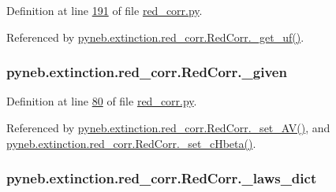 \begin{DoxyVerb}
Definition at line \hyperlink{red__corr_8py_source_l00191}{191} of file \hyperlink{red__corr_8py_source}{red\-\_\-corr.\-py}.



Referenced by \hyperlink{red__corr_8py_source_l00156}{pyneb.\-extinction.\-red\-\_\-corr.\-Red\-Corr.\-\_\-get\-\_\-uf()}.

\hypertarget{classpyneb_1_1extinction_1_1red__corr_1_1_red_corr_a99ab4dcd33d50360f4fb61bc80fc90d5}{
\subsubsection[{\-\_\-given}]{\setlength{\rightskip}{0pt plus 5cm}pyneb.\-extinction.\-red\-\_\-corr.\-Red\-Corr.\-\_\-given\hspace{0.3cm}{\ttfamily [private]}}}\label{classpyneb_1_1extinction_1_1red__corr_1_1_red_corr_a99ab4dcd33d50360f4fb61bc80fc90d5}


Definition at line \hyperlink{red__corr_8py_source_l00080}{80} of file \hyperlink{red__corr_8py_source}{red\-\_\-corr.\-py}.



Referenced by \hyperlink{red__corr_8py_source_l00169}{pyneb.\-extinction.\-red\-\_\-corr.\-Red\-Corr.\-\_\-set\-\_\-\-A\-V()}, and \hyperlink{red__corr_8py_source_l00164}{pyneb.\-extinction.\-red\-\_\-corr.\-Red\-Corr.\-\_\-set\-\_\-c\-Hbeta()}.

\hypertarget{classpyneb_1_1extinction_1_1red__corr_1_1_red_corr_a96fbed6f54a26dd2f59fe6441c9c3865}{
\subsubsection[{\-\_\-laws\-\_\-dict}]{\setlength{\rightskip}{0pt plus 5cm}pyneb.\-extinction.\-red\-\_\-corr.\-Red\-Corr.\-\_\-laws\-\_\-dict\hspace{0.3cm}{\ttfamily [private]}}}\label{classpyneb_1_1extinction_1_1red__corr_1_1_red_corr_a96fbed6f54a26dd2f59fe6441c9c3865}



\end{DoxyVerb}
